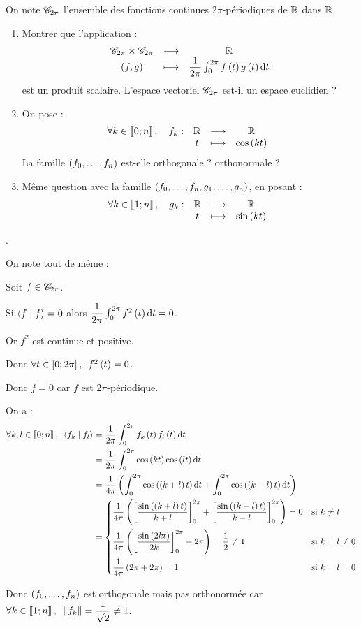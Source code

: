 \begin{exo}
On note \(\mathscr{C}_{2\pi}\) l'ensemble des fonctions continues \(2\pi\)-périodiques de \(\mathbb{R}\) dans \(\mathbb{R}\).

\begin{enumerate}
\item Montrer que l'application : \[\fonctionlambda{\fami{C}_{2\pi}\times\fami{C}_{2\pi}}{\R}{\paren{f,g}}{\dfrac{1}{2\pi}\int_0^{2\pi}f\paren{t}g\paren{t}\odif{t}}\] est un produit scalaire. L'espace vectoriel \(\mathscr{C}_{2\pi}\) est-il un espace euclidien ? \\
\item On pose : \[\quantifs{\forall k\in\interventierii{0}{n}}\fonction{f_k}{\R}{\R}{t}{\cos\paren{kt}}\] La famille \(\left(f_0,\dots,f_n\right)\) est-elle orthogonale ? orthonormale ? \\
\item Même question avec la famille \(\left(f_0,\dots,f_n,g_1,\dots,g_n\right)\), en posant : \[\quantifs{\forall k\in\interventierii{1}{n}}\fonction{g_k}{\R}{\R}{t}{\sin\paren{kt}}\]
\end{enumerate}
\end{exo}

\begin{corr}[1]
\Cf {}.

On note tout de même :

Soit \(f\in\mathscr{C}_{2\pi}\).

Si \(\left\langle f\;\middle|\; f\right\rangle=0\) alors \(\dfrac{1}{2\pi}\int_0^{2\pi}f^2\paren{t}\odif{t}=0\).

Or \(f^2\) est continue et positive.

Donc \(\quantifs{\forall t\in\intervii{0}{2\pi}}f^2\paren{t}=0\).

Donc \(f=0\) car \(f\) est \(2\pi\)-périodique.
\end{corr}

\begin{corr}[2]
On a : \[\begin{aligned}
\quantifs{\forall k,l\in\interventierii{0}{n}}\ps{f_k}{f_l}&=\dfrac{1}{2\pi}\int_0^{2\pi}f_k\paren{t}f_l\paren{t}\odif{t} \\
&=\dfrac{1}{2\pi}\int_0^{2\pi}\cos\paren{kt}\cos\paren{lt}\odif{t} \\
&=\dfrac{1}{4\pi}\paren{\int_0^{2\pi}\cos\paren{\paren{k+l}t}\odif{t}+\int_0^{2\pi}\cos\paren{\paren{k-l}t}\odif{t}} \\
&=\begin{dcases}
\dfrac{1}{4\pi}\paren{\croch{\dfrac{\sin\paren{\paren{k+l}t}}{k+l}}_0^{2\pi}+\croch{\dfrac{\sin\paren{\paren{k-l}t}}{k-l}}_0^{2\pi}}=0 &\text{si }k\not=l \\
\dfrac{1}{4\pi}\paren{\croch{\dfrac{\sin\paren{2kt}}{2k}}_0^{2\pi}+2\pi}=\dfrac{1}{2}\not=1 &\text{si }k=l\not=0 \\
\dfrac{1}{4\pi}\paren{2\pi+2\pi}=1 &\text{si }k=l=0
\end{dcases}
\end{aligned}\]

Donc \(\left(f_0,\dots,f_n\right)\) est orthogonale mais pas orthonormée car \(\quantifs{\forall k\in\interventierii{1}{n}}\norme{f_k}=\dfrac{1}{\sqrt{2}}\not=1\).
\end{corr}

